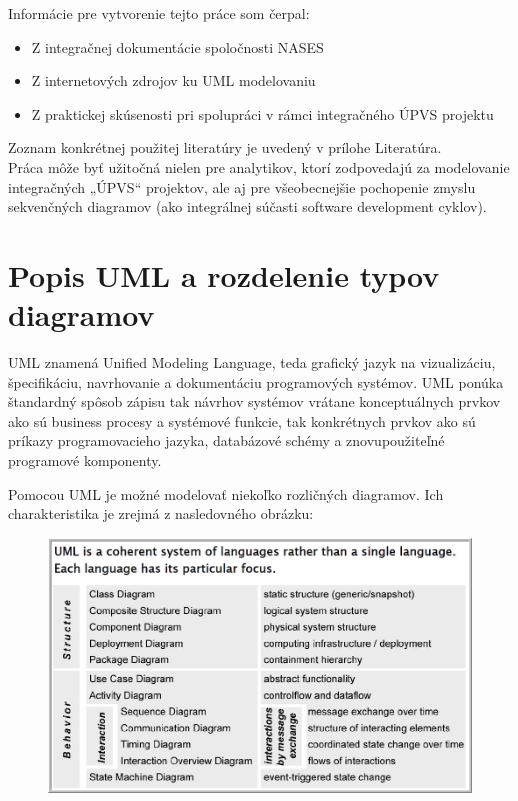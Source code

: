 \documentclass[10pt,twoside,slovak,a4paper]{article}
\begin{document}
Informácie pre vytvorenie tejto práce som čerpal:

\begin{itemize}
\item Z integračnej dokumentácie spoločnosti NASES
\item Z internetových zdrojov ku UML modelovaniu
\item Z praktickej skúsenosti pri spolupráci v rámci integračného ÚPVS projektu
\end{itemize}
Zoznam konkrétnej použitej literatúry je uvedený v prílohe Literatúra.\\

Práca môže byť užitočná nielen pre analytikov, ktorí zodpovedajú za modelovanie integračných „ÚPVS“ projektov, ale aj pre všeobecnejšie pochopenie zmyslu sekvenčných diagramov (ako integrálnej súčasti software development cyklov).


\section{Popis UML a rozdelenie typov diagramov} \label{2sek}

UML znamená Unified Modeling Language, teda grafický jazyk na vizualizáciu, špecifikáciu, navrhovanie a dokumentáciu programových systémov. 
\newpage
UML ponúka štandardný spôsob zápisu tak návrhov systémov vrátane konceptuálnych prvkov ako sú business procesy a systémové funkcie, tak konkrétnych prvkov ako sú príkazy programovacieho jazyka, databázové schémy a znovupoužiteľné programové komponenty.\cite{WIKI}\newline

Pomocou UML je možné modelovať niekoľko rozličných diagramov. Ich charakteristika je zrejmá z nasledovného obrázku\cite{UMLUni}:


\begin{figure}[h]
\centering
\includegraphics[width=\textwidth]{Images/Obr1.jpg}
\end{figure}
\end{document}
